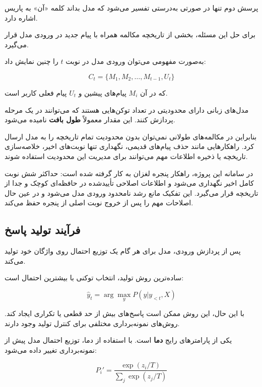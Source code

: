 پرسش دوم تنها در صورتی به‌درستی تفسیر می‌شود که مدل بداند
کلمه «آن» به پاریس اشاره دارد.

برای حل این مسئله، بخشی از تاریخچه مکالمه همراه با پیام جدید
در ورودی مدل قرار می‌گیرد.

به‌صورت مفهومی می‌توان ورودی مدل در نوبت $t$ را چنین نمایش داد:

\begin{equation}
C_t
=
\{M_1,M_2,\ldots,M_{t-1},U_t\}
\end{equation}

که در آن $M_i$ پیام‌های پیشین و $U_t$ پیام فعلی کاربر است.

مدل‌های زبانی دارای محدودیتی در تعداد توکن‌هایی هستند که
می‌توانند در یک مرحله پردازش کنند.
این مقدار معمولاً
\textbf{طول بافت}
نامیده می‌شود.

بنابراین در مکالمه‌های طولانی نمی‌توان بدون محدودیت تمام
تاریخچه را به مدل ارسال کرد.
راهکارهایی مانند حذف پیام‌های قدیمی، نگهداری تنها نوبت‌های
اخیر، خلاصه‌سازی تاریخچه یا ذخیره اطلاعات مهم می‌توانند برای
مدیریت این محدودیت استفاده شوند.

در سامانه این پروژه، راهکار پنجره لغزان به کار گرفته شده است:
حداکثر شش نوبت کامل اخیر نگهداری می‌شود و اطلاعات اصلاحی
تأییدشده در حافظه‌ای کوچک و جدا از تاریخچه قرار می‌گیرد. این
تفکیک مانع رشد نامحدود ورودی مدل می‌شود و در عین حال اصلاحات
مهم را پس از خروج نوبت اصلی از پنجره حفظ می‌کند.


\subsection{فرآیند تولید پاسخ}

پس از پردازش ورودی، مدل برای هر گام یک توزیع احتمال روی
واژگان خود تولید می‌کند.

ساده‌ترین روش تولید، انتخاب توکنی با بیشترین احتمال است:

\begin{equation}
\hat{y}_t
=
\arg\max_y
P(y|y_{<t},X)
\end{equation}

با این حال، این روش ممکن است پاسخ‌های بیش از حد قطعی یا
تکراری ایجاد کند.
روش‌های نمونه‌برداری مختلفی برای کنترل تولید وجود دارند.

یکی از پارامترهای رایج
\textbf{دما}
است.
با استفاده از دما، توزیع احتمال مدل پیش از نمونه‌برداری
تغییر داده می‌شود:

\begin{equation}
P_i'
=
\frac{
\exp(z_i/T)
}{
\sum_j \exp(z_j/T)
}
\end{equation}

